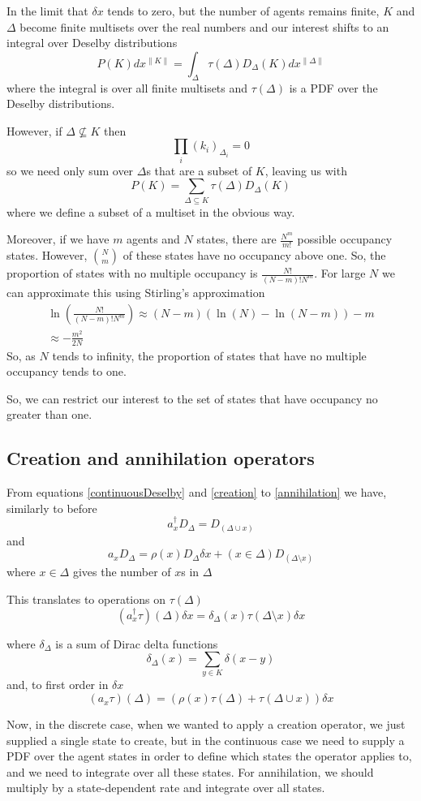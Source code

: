 \documentclass[letterpaper,twocolumn,10pt]{article}
\begin{document}
In the limit that $\delta x$ tends to zero, but the number of agents remains finite, $K$ and $\Delta$ become finite multisets over the real numbers and our interest shifts to an integral over Deselby distributions
\[
P(K) dx^{\lVert K \rVert} = \int_\Delta \tau(\Delta) D_\Delta(K) dx^{\lVert\Delta \rVert}
\]
where the integral is over all finite multisets and $\tau(\Delta)$ is a PDF over the Deselby distributions.

However, if $\Delta \not\subseteq K$ then
\[
\prod_i(k_i)_{\Delta_i} = 0 
\]
so we need only sum over $\Delta$s that are a subset of $K$, leaving us with
\[
P(K) = \sum_{\Delta\subseteq K} \tau(\Delta) D_\Delta(K)
\]
where we define a subset of a multiset in the obvious way.

Moreover, if we have $m$ agents and $N$ states, there are $\frac{N^m}{m!}$ possible occupancy states. However, ${N \choose m}$ of these states have no occupancy above one. So, the proportion of states with no multiple occupancy is $\frac{N!}{(N-m)!N^m}$. For large $N$ we can approximate this using Stirling's approximation
\[
\begin{split}
\ln\left(\frac{N!}{(N-m)!N^m}\right) 
\approx (N-m)(\ln(N) - \ln(N-m)) - m \\
\approx -\frac{m^2}{2N}
\end{split}
\]
So, as $N$ tends to infinity, the proportion of states that have no multiple occupancy tends to one.

So, we can restrict our interest to the set of states that have occupancy no greater than one.

\subsection{Creation and annihilation operators}

From equations \ref{continuousDeselby} and \ref{creation} to \ref{annihilation} we have, similarly to before
\[
a_x^\dag D_\Delta = D_{(\Delta \cup x)}
\]
and
\[
a_x D_\Delta = \rho(x) D_\Delta \delta x + (x \in \Delta) D_{(\Delta \setminus x)}
\]
where $x \in \Delta$ gives the number of $x$s in $\Delta$

This translates to operations on $\tau(\Delta)$
\[
(a_x^\dag \tau)(\Delta)\delta x = \delta_\Delta(x)\tau(\Delta \setminus x)\delta x
\]

where $\delta_\Delta$ is a sum of Dirac delta functions
\[
\delta_\Delta(x) = \sum_{y\in K}\delta(x-y)
\]
and, to first order in $\delta x$
\[
(a_x \tau)(\Delta) = \left(\rho(x)\tau(\Delta) + \tau(\Delta \cup x)\right) \delta x
\]

Now, in the discrete case, when we wanted to apply a creation operator, we just supplied a single state to create, but in the continuous case we need to supply a PDF over the agent states in order to define which states the operator applies to, and we need to integrate over all these states. For annihilation, we should multiply by a state-dependent rate and integrate over all states.






\end{document}
